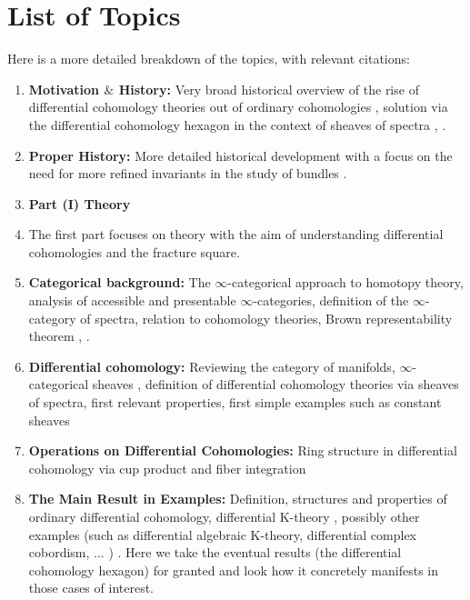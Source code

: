 \documentclass[10pt]{amsart}
\begin{document}
\section{List of Topics}
Here is a more detailed breakdown of the topics, with relevant citations:
\begin{enumerate}[itemsep=0.3cm]
	\item \textbf{Motivation $\&$ History:} Very broad historical overview of the rise of differential cohomology theories out of ordinary cohomologies \cite{hopkinssinger2005differentialcoh,simonssullivan2008diffcoh,stimpson2011diffcoh}, solution via the differential cohomology hexagon in the context of sheaves of spectra \cite[Section 2]{adh2021differentialcohomology}, \cite{debray2023diffcoh}.
	\item \textbf{Proper History:} More detailed historical development with a focus on the need for more refined invariants in the study of bundles \cite{hopkinssinger2005differentialcoh,simonssullivan2008diffcoh,stimpson2011diffcoh}.
	\item[] \textbf{\large Part (I) Theory}
	\item[] The first part focuses on theory with the aim of understanding differential cohomologies and the fracture square. 
	\item \textbf{Categorical background:} The $\infty$-categorical approach to homotopy theory, analysis of accessible and presentable $\infty$-categories, definition of the $\infty$-category of spectra, relation to cohomology theories, Brown representability theorem \cite[Section 1]{lurie2017ha}, \cite{groth2010inftycats}.
	\item \textbf{Differential cohomology:} Reviewing the category of manifolds, $\infty$-categorical sheaves \cite[Section 6]{lurie2009htt}, definition of differential cohomology theories via sheaves	of spectra, first relevant properties, first simple examples such as constant sheaves \cite[Section 2]{adh2021differentialcohomology}
	\item \textbf{Operations on Differential Cohomologies:} Ring structure in differential cohomology via cup product \cite[Section 8]{adh2021differentialcohomology} and fiber integration \cite[Section 9]{adh2021differentialcohomology}
	\item \textbf{The Main Result in Examples:} Definition, structures and properties of ordinary differential cohomology, differential K-theory \cite[Section 7]{adh2021differentialcohomology}, possibly other examples (such as differential algebraic K-theory, differential complex cobordism, ... ) . Here we take the eventual results (the differential cohomology hexagon) for granted and look how it concretely manifests in those cases of interest.

\end{enumerate}
\end{document}
